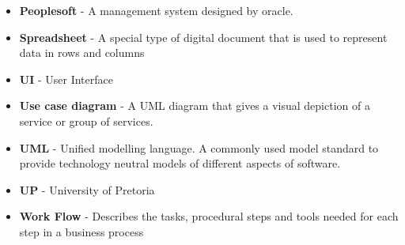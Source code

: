 \begin{itemize}
\item \textbf{Peoplesoft} - A management system designed by oracle. 
\item \textbf{Spreadsheet} - A special type of digital document that is used to represent data in rows and columns
\item \textbf{UI} - User Interface
\item \textbf{Use case diagram} - A UML diagram that gives a visual depiction of a service or group of services.
\item \textbf{UML} - Unified modelling language. A commonly used model standard to provide technology neutral models of different aspects of software.
\item \textbf{UP} - University of Pretoria
\item \textbf{Work Flow} - Describes the tasks, procedural steps and tools needed for each step in a business process
\end{itemize}		


\vspace{0.5in}
